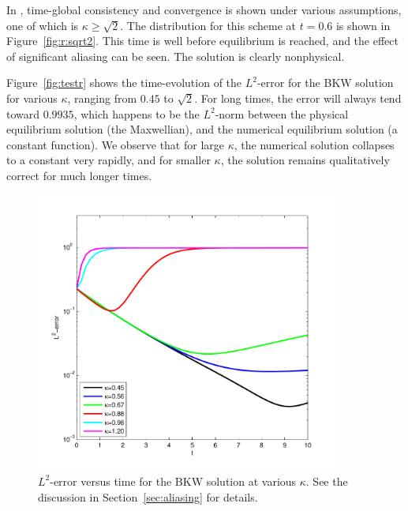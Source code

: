 In \cite{Filbet11}, time-global consistency and convergence is shown under
various assumptions, one of which is $\kappa\geq\sqrt{2}$. The distribution for
this scheme at $t=0.6$ is shown in Figure~\vref{fig:r:sqrt2}. This time is well
before equilibrium is reached, and the effect of significant aliasing can be
seen. The solution is clearly nonphysical.

Figure~\vref{fig:testr} shows the time-evolution of the $L^2$-error for the BKW
solution for various $\kappa$, ranging from $0.45$ to $\sqrt{2}$. For long
times, the error will always tend toward $0.9935$, which happens to be the
$L^2$-norm between the physical equilibrium solution (the Maxwellian), and the
numerical equilibrium solution (a constant function). We observe that for large
$\kappa$, the numerical solution collapses to a constant very rapidly, and for
smaller $\kappa$, the solution remains qualitatively correct for much longer
times.

\begin{figure}
    \centering
    \includegraphics[width=10cm]{figs/hcboltz/testr}
    \caption{$L^2$-error versus time for the BKW solution at various $\kappa$. See the discussion in
    Section~\vref{sec:aliasing} for details.}
    \label{fig:testr}
\end{figure}
